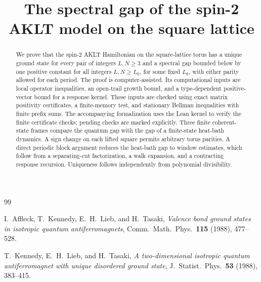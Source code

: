 \documentclass[11pt,reqno]{amsart}
\theoremstyle{plain}
\theoremstyle{definition}
\theoremstyle{remark}
\numberwithin{equation}{section}
\begin{document}
\title{The spectral gap of the spin-2 AKLT model on the square lattice}

\begin{abstract}
We prove that the spin-2 AKLT Hamiltonian on the square-lattice torus
has a unique ground state for every pair of integers $L,N\ge3$ and a
spectral gap bounded below by one positive constant for all integers
$L,N\ge L_0$, for some fixed $L_0$, with either parity allowed for
each period. The proof is computer-assisted. Its computational inputs
are local operator inequalities, an open-trail growth bound, and a
type-dependent positive-vector bound for a response kernel. These
inputs are checked using exact matrix positivity certificates, a
finite-memory test, and stationary Bellman inequalities with finite
prefix sums. The accompanying formalization uses the Lean kernel
to verify the finite certificate checks; pending checks are marked
explicitly.
Three finite coherent-state frames compare the quantum gap with the
gap of a finite-state heat-bath dynamics. A sign change on each lifted
square permits arbitrary torus parities. A direct periodic block
argument reduces the heat-bath gap to window estimates, which follow
from a separating-cut factorization, a walk expansion, and a
contracting response recursion. Uniqueness follows independently from
polynomial divisibility.
\end{abstract}

\maketitle
\setcounter{tocdepth}{1}
\tableofcontents










\appendix





\begin{thebibliography}{99}

I.~Affleck, T.~Kennedy, E.~H.~Lieb, and H.~Tasaki,
\emph{Valence bond ground states in isotropic quantum antiferromagnets},
Comm.\ Math.\ Phys.\ \textbf{115} (1988), 477--528.

T.~Kennedy, E.~H.~Lieb, and H.~Tasaki,
\emph{A two-dimensional isotropic quantum antiferromagnet with unique disordered ground state},
J.\ Statist.\ Phys.\ \textbf{53} (1988), 383--415.

\end{thebibliography}
\end{document}
